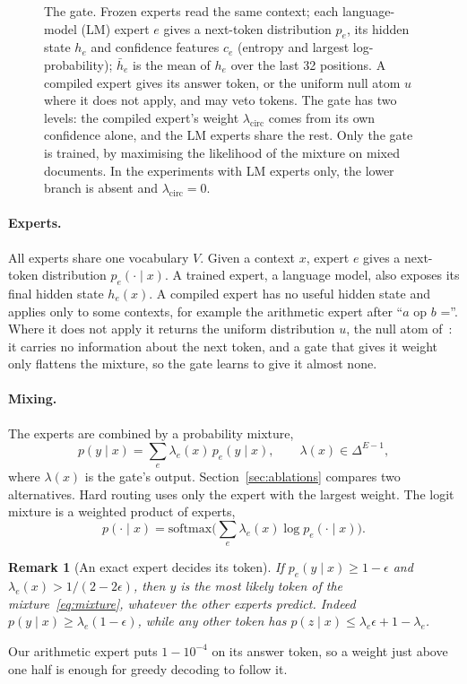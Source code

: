 \documentclass[10pt]{article}
\newtheorem{remark}{Remark}
\begin{document}
\begin{figure}[t]
\caption{The gate. Frozen experts read the same context; each language-model (LM) expert $e$
gives a next-token distribution $p_e$, its hidden state $h_e$ and confidence features $c_e$
(entropy and largest log-probability); $\bar h_e$ is the mean of $h_e$ over the last 32
positions. A compiled expert gives its answer token, or the uniform null atom $u$ where it does
not apply, and may veto tokens. The gate has two levels: the compiled expert's weight
$\lambda_{\mathrm{circ}}$ comes from its own confidence alone, and the LM experts share the rest.
Only the gate is trained, by maximising the likelihood of the mixture on mixed documents. In
the experiments with LM experts only, the lower branch is absent and
$\lambda_{\mathrm{circ}}=0$.}
\label{fig:gate}
\end{figure}
\paragraph{Experts.} All experts share one vocabulary $V$. Given a context $x$, expert $e$ gives
a next-token distribution $p_e(\cdot\mid x)$. A trained expert, a language model, also exposes
its final hidden state $h_e(x)$. A compiled expert has no useful hidden state and applies only
to some contexts, for example the arithmetic expert after ``$a$ op $b$ =''. Where it does not
apply it returns the uniform distribution $u$, the null atom of~\citet{mossaiby_roas}: it
carries no information about the next token, and a gate that gives it weight only flattens the
mixture, so the gate learns to give it almost none.

\paragraph{Mixing.} The experts are combined by a probability mixture,
\begin{equation}
p(y\mid x) = \sum_e \lambda_e(x)\, p_e(y\mid x), \qquad \lambda(x) \in \Delta^{E-1},
\label{eq:mixture}
\end{equation}
where $\lambda(x)$ is the gate's output. Section~\ref{sec:ablations} compares two alternatives.
Hard routing uses only the expert with the largest weight. The logit mixture is a weighted
product of experts,
\[
p(\cdot\mid x) = \mathrm{softmax}\Big(\sum_e \lambda_e(x) \log p_e(\cdot\mid x)\Big).
\]
\begin{remark}[An exact expert decides its token]
If $p_e(y\mid x)\ge 1-\epsilon$ and $\lambda_e(x) > 1/(2-2\epsilon)$, then $y$ is the most
likely token of the mixture~\eqref{eq:mixture}, whatever the other experts predict. Indeed
$p(y\mid x)\ge\lambda_e(1-\epsilon)$, while any other token has
$p(z\mid x)\le\lambda_e\epsilon+1-\lambda_e$.
\end{remark}
Our arithmetic expert puts $1-10^{-4}$ on its answer token, so a weight just above one half is
enough for greedy decoding to follow it.
\end{document}
